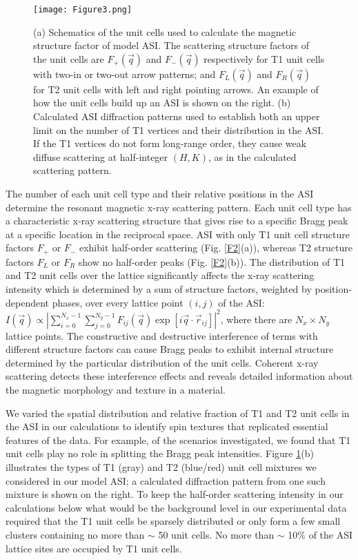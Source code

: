 \documentclass[aps, prb, reprint, showpacs, superscriptaddress]{revtex4-1}
\begin{document}
\begin{figure}
\texttt{[image: Figure3.png]}
\caption{ 
(a) Schematics of the unit cells used to calculate the magnetic structure factor of model ASI.
The scattering structure factors of the unit cells are $F_+(\vec{q})$ and $F_-(\vec{q})$ respectively for T1 unit cells with two-in or two-out arrow patterns; and $F_L(\vec{q})$ and $F_R(\vec{q})$ for T2 unit cells with left and right pointing arrows.
An example of how the unit cells build up an ASI is shown on the right.
(b) Calculated ASI diffraction patterns used to establish both an upper limit on the number of T1 vertices and their distribution in the ASI. 
If the T1 vertices do not form long-range order, they cause weak diffuse scattering at half-integer $(H, K)$, as in the calculated scattering pattern.
}
\label{F3}
\end{figure}

The number of each unit cell type and their relative positions in the ASI determine the resonant magnetic x-ray scattering pattern.
Each unit cell type has a characteristic x-ray scattering structure that gives rise to a specific Bragg peak at a specific location in the reciprocal space.\cite{Note1}
ASI with only T1 unit cell structure factors $F_+$ or $F_-$ exhibit half-order scattering (Fig. \ref{F2}(a)), whereas T2 structure factors $F_L$ or $F_R$ show no half-order peaks (Fig. \ref{F2}(b)).
The distribution of T1 and T2 unit cells over the lattice significantly affects the x-ray scattering intensity which is determined by a sum of structure factors, weighted by position-dependent phases, over every lattice point $(i,j)$ of the ASI: 
$I(\vec{q}) \propto | \sum_{ i=0 }^{ N_x-1 } \sum_{ j=0 }^{ N_y-1 } F_{ij}(\vec{q}) \exp[ i \vec{q} \cdot \vec{r}_{ij}] | ^ 2$, where there are $N_x \times N_y$ lattice points. 
The constructive and destructive interference of terms with different structure factors can cause Bragg peaks to exhibit internal structure determined by the particular distribution of the unit cells. 
Coherent x-ray scattering detects these interference effects and reveals detailed information about the magnetic morphology and texture in a material.

We varied the spatial distribution and relative fraction of T1 and T2 unit cells in the ASI in our calculations to identify spin textures that replicated essential features of the data. 
For example, of the scenarios investigated, we found that T1 unit cells play no role in splitting the Bragg peak intensities. 
Figure \ref{F3}(b) illustrates the types of T1 (gray) and T2 (blue/red) unit cell mixtures we considered in our model ASI; a calculated diffraction pattern from one such mixture is shown on the right. 
To keep the half-order scattering intensity in our calculations below what would be the background level in our experimental data required that the T1 unit cells be sparsely distributed or only form a few small clusters containing no more than $\sim$ 50 unit cells.
No more than $\sim$ 10\% of the ASI lattice sites are occupied by T1 unit cells.
\end{document}
